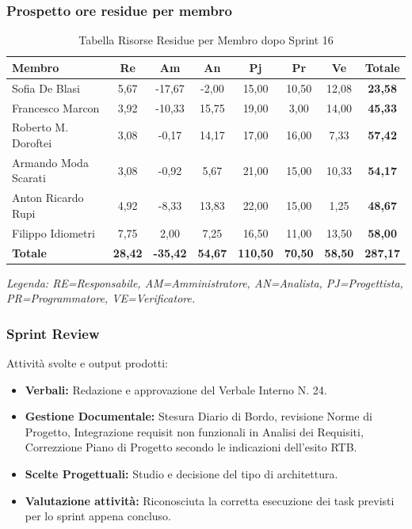 \subsubsection{Prospetto ore residue per membro}
\begin{table}[H]
    \centering
    \renewcommand{\arraystretch}{1.3}
    \begin{tabularx}{\textwidth}{|X|c|c|c|c|c|c|c|}
        \hline
        \textbf{Membro} & \textbf{Re} & \textbf{Am} & \textbf{An} &
        \textbf{Pj} & \textbf{Pr} & \textbf{Ve} & \textbf{Totale} \\
        \hline
        Sofia De Blasi       &  5,67 & -17,67 &  -2,00 & 15,00 & 10,50 & 12,08 & \textbf{23,58} \\
        Francesco Marcon     &  3,92 &  -10,33 & 15,75 & 19,00 &  3,00 & 14,00 & \textbf{45,33} \\
        Roberto M. Doroftei  &  3,08 &  -0,17 & 14,17 & 17,00 & 16,00 &  7,33 & \textbf{57,42} \\
        Armando Moda Scarati &  3,08 &  -0,92 &  5,67 & 21,00 & 15,00 & 10,33 & \textbf{54,17} \\
        Anton Ricardo Rupi   &  4,92 &  -8,33 & 13,83 & 22,00 & 15,00 &  1,25 & \textbf{48,67} \\
        Filippo Idiometri    &  7,75 &   2,00 &  7,25 & 16,50 & 11,00 & 13,50 & \textbf{58,00} \\
        \hline
        \textbf{Totale} &
        \textbf{28,42} & \textbf{-35,42} & \textbf{54,67} &
        \textbf{110,50} & \textbf{70,50} & \textbf{58,50} &
        \textbf{287,17} \\
        \hline
    \end{tabularx}
    \begin{minipage}{\textwidth}
        \smallskip
        \footnotesize\textit{Legenda: RE=Responsabile, AM=Amministratore,
        AN=Analista, PJ=Progettista, PR=Programmatore, VE=Verificatore.}
    \end{minipage}
    \caption{Tabella Risorse Residue per Membro dopo Sprint 16}
\end{table}

\subsubsection{Sprint Review}
Attività svolte e output prodotti:
\begin{itemize}
    \item \textbf{Verbali:} Redazione e approvazione del Verbale Interno N. 24.
    \item \textbf{Gestione Documentale:} Stesura Diario di Bordo, revisione Norme di Progetto, Integrazione requisit non funzionali in Analisi dei Requisiti, Correzzione Piano di Progetto secondo le indicazioni dell'esito RTB.
    \item \textbf{Scelte Progettuali:} Studio e decisione del tipo di architettura.
    \item \textbf{Valutazione attività:} Riconosciuta la corretta esecuzione dei task previsti per lo sprint appena concluso.
\end{itemize}

